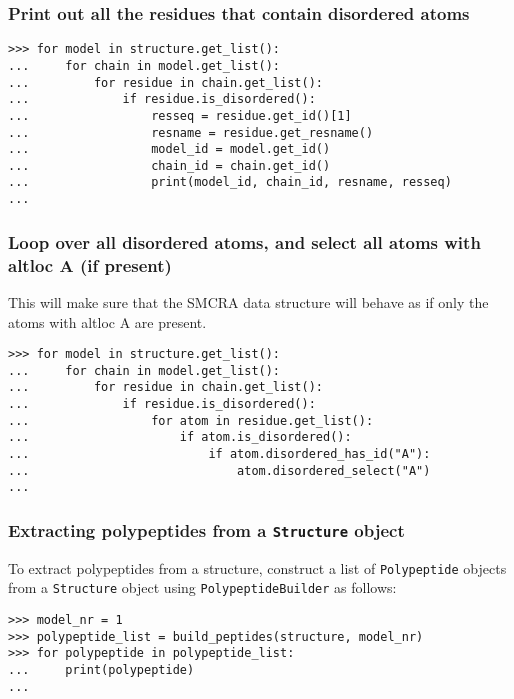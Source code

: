 \subsubsection*{Print out all the residues that contain disordered atoms}

\begin{verbatim}
>>> for model in structure.get_list():
...     for chain in model.get_list():
...         for residue in chain.get_list():
...             if residue.is_disordered():
...                 resseq = residue.get_id()[1]
...                 resname = residue.get_resname()
...                 model_id = model.get_id()
...                 chain_id = chain.get_id()
...                 print(model_id, chain_id, resname, resseq)
...
\end{verbatim}

\subsubsection*{Loop over all disordered atoms, and select all atoms with altloc A (if present)}
This will make sure that the SMCRA data structure will behave as if only the
atoms with altloc A are present.

\begin{verbatim}
>>> for model in structure.get_list():
...     for chain in model.get_list():
...         for residue in chain.get_list():
...             if residue.is_disordered():
...                 for atom in residue.get_list():
...                     if atom.is_disordered():
...                         if atom.disordered_has_id("A"):
...                             atom.disordered_select("A")
...
\end{verbatim}

\subsubsection*{Extracting polypeptides from a \texttt{Structure} object\label{subsubsec:extracting_polypeptides}}

To extract polypeptides from a structure, construct a list of \texttt{Polypeptide} objects from a \texttt{Structure} object using \texttt{PolypeptideBuilder} as follows:

\begin{verbatim}
>>> model_nr = 1
>>> polypeptide_list = build_peptides(structure, model_nr)
>>> for polypeptide in polypeptide_list:
...     print(polypeptide)
...
\end{verbatim}

